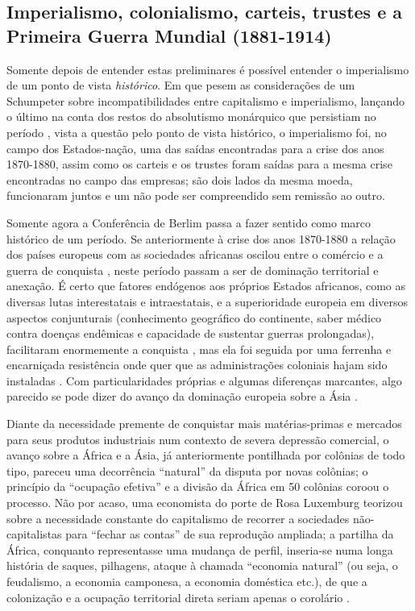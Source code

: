 \subsection{Imperialismo, colonialismo, carteis, trustes e a Primeira Guerra Mundial (1881-1914)}

Somente depois de entender estas preliminares é possível entender o imperialismo de um ponto de vista \textit{histórico}. Em que pesem as considerações de um Schumpeter sobre incompatibilidades entre capitalismo e imperialismo, lançando o último na conta dos restos do absolutismo monárquico que persistiam no período \cite{schumpeter_imperialismo_1961}, vista a questão pelo ponto de vista histórico, o imperialismo foi, no campo dos Estados-nação, uma das saídas encontradas para a crise dos anos 1870-1880, assim como os carteis e os trustes foram saídas para a mesma crise encontradas no campo das empresas; são dois lados da mesma moeda, funcionaram juntos e um não pode ser compreendido sem remissão ao outro.

Somente agora a Conferência de Berlim passa a fazer sentido como marco histórico de um período. Se anteriormente à crise dos anos 1870-1880 a relação dos países europeus com as sociedades africanas oscilou entre o comércio e a guerra de conquista \cite{ogot_hisaf5_2010,AJAYI2010}, neste período passam a ser de dominação territorial e anexação. É certo que fatores endógenos aos próprios Estados africanos, como as diversas lutas interestatais e intraestatais, e a superioridade europeia em diversos aspectos conjunturais (conhecimento geográfico do continente, saber médico contra doenças endêmicas e capacidade de sustentar guerras prolongadas), facilitaram enormemente a conquista \cite{uzoigwe_partilha_2010}, mas ela foi seguida por uma ferrenha e encarniçada resistência onde quer que as administrações coloniais hajam sido instaladas \cite[p.~51-318]{boahen_hisaf7_2010}. Com particularidades próprias e algumas diferenças marcantes, algo parecido se pode dizer do avanço da dominação europeia sobre a Ásia \cite{panikkar_domasia_1977}. 

Diante da necessidade premente de conquistar mais matérias-primas e mercados para seus produtos industriais num contexto de severa depressão comercial, o avanço sobre a África e a Ásia, já anteriormente pontilhada por colônias de todo tipo, pareceu uma decorrência ``natural'' da disputa por novas colônias; o princípio da ``ocupação efetiva'' e a divisão da África em 50 colônias coroou o processo. Não por acaso, uma economista do porte de Rosa Luxemburg teorizou sobre a necessidade constante do capitalismo de recorrer a sociedades não-capitalistas para ``fechar as contas'' de sua reprodução ampliada; a partilha da África, conquanto representasse uma mudança de perfil, inseria-se numa longa história de saques, pilhagens, ataque à chamada ``economia natural'' (ou seja, o feudalismo, a economia camponesa, a economia doméstica etc.), de que a colonização e a ocupação territorial direta seriam apenas o corolário \cite{luxemburg_acumula_1985}.

